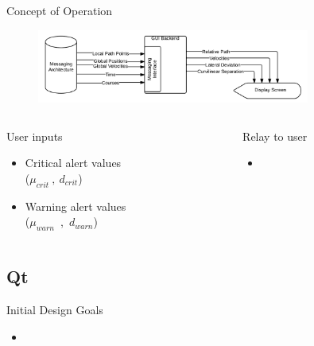 \documentclass{beamer}
\begin{document}
  \begin{frame}{Concept of Operation}
    \begin{figure}
      \includegraphics[width=0.8\textwidth]{../graphics/blackbox_flowchart.png}
    \end{figure}
    \begin{columns}  
      \begin{column}{0.5\textwidth}
        \footnotesize User inputs
        \begin{itemize} \footnotesize
          \item Critical alert values\\ ($\mu_{crit}~,~d_{crit}$)
          \item Warning alert values\\ ($\mu_{warn}$~,~$d_{warn}$)
        \end{itemize}
      \end{column}
      \begin{column}{0.5\textwidth}
        \footnotesize Relay to user
        \begin{itemize} \footnotesize
          \item 
        \end{itemize}
      \end{column}
    \end{columns}
  \end{frame}



  \subsection{Qt}

    \begin{frame}{Initial Design Goals}
      \begin{itemize}
        \item
      \end{itemize}
    \end{frame}
\end{document}
